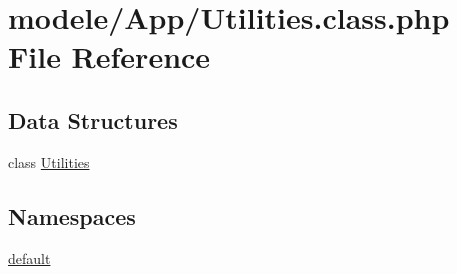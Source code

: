 \hypertarget{_utilities_8class_8php}{}\section{modele/\+App/\+Utilities.class.\+php File Reference}
\label{_utilities_8class_8php}
\subsection*{Data Structures}
\begin{DoxyCompactItemize}
\item 
class \hyperlink{class_utilities}{Utilities}
\end{DoxyCompactItemize}
\subsection*{Namespaces}
\begin{DoxyCompactItemize}
\item 
 \hyperlink{namespacedefault}{default}
\end{DoxyCompactItemize}
